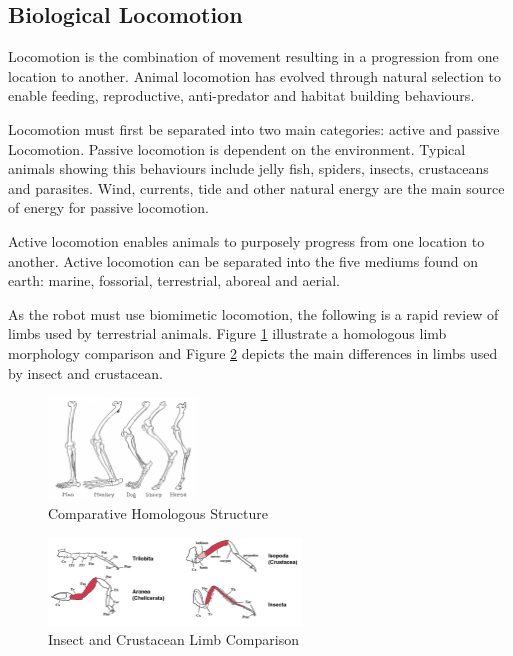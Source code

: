 \subsection{Biological Locomotion}
Locomotion is the combination of movement resulting in a progression from one location to another. Animal locomotion has evolved through natural selection to enable feeding, reproductive, anti-predator and habitat building behaviours. \cite{encyclopedia_locomotion_nodate}

Locomotion must first be separated into two main categories: active and passive Locomotion. Passive locomotion is  dependent on the environment. Typical animals showing this behaviours include jelly fish, spiders, insects, crustaceans and parasites. Wind, currents, tide and other natural energy are the main source of energy for passive locomotion. \cite{encyclopedia_locomotion_nodate}

Active locomotion enables animals to purposely progress from one location to another. Active locomotion can be separated into the five mediums found on earth: marine, fossorial, terrestrial, aboreal and aerial. \cite{encyclopedia_locomotion_nodate}

As the robot must use biomimetic locomotion, the following is a rapid review of limbs used by terrestrial animals. Figure \ref{fig:human} illustrate a homologous limb morphology comparison and Figure \ref{fig:insect} depicts the main differences in limbs used by insect and crustacean.

\begin{figure}[H]
    \centering
    \includegraphics[width=0.35\textwidth]{Sections/LiteratureReview/img/Animals/humanLimbs.jpg}
    \caption{Comparative Homologous Structure \cite{tes_teach_comparative_nodate}}
    \label{fig:human}
\end{figure}

\begin{figure}[H]
    \centering
    \includegraphics[width=0.6\textwidth]{Sections/LiteratureReview/img/Animals/InsectLimbs.png}
    \caption{Insect and Crustacean Limb Comparison \cite{abzhanov_fig._nodate}}
    \label{fig:insect}
\end{figure}



